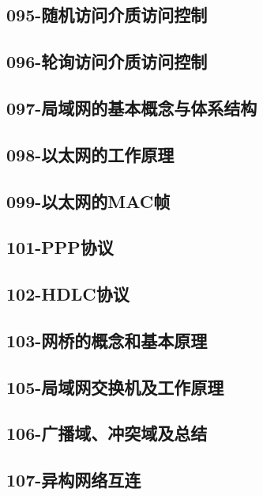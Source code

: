 \subsection{095-随机访问介质访问控制}

\subsection{096-轮询访问介质访问控制}

\subsection{097-局域网的基本概念与体系结构}

\subsection{098-以太网的工作原理}

\subsection{099-以太网的MAC帧}

\subsection{101-PPP协议}

\subsection{102-HDLC协议}

\subsection{103-网桥的概念和基本原理}

\subsection{105-局域网交换机及工作原理}

\subsection{106-广播域、冲突域及总结}

\subsection{107-异构网络互连}

